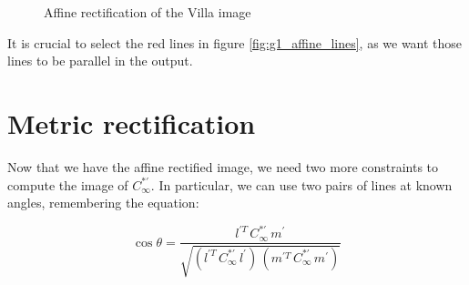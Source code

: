 \documentclass{Configuration_Files/PoliMi3i_thesis}
\begin{document}
\begin{figure}[H]
    \centering
    \quad
    \caption{Affine rectification of the Villa image}
    \label{fig:g1_affine}
\end{figure}

It is crucial to select the red lines in figure \ref{fig:g1_affine_lines}, as we want those lines to be parallel in the output.

\section{Metric rectification}
Now that we have the affine rectified image, we need two more constraints to compute the image of $C^{*'}_\infty$. In particular, we can use two pairs of lines at known angles, remembering the equation:

\[
\cos\theta = \frac{l^{'T}\,C^{*'}_\infty\,m^{'}}{\sqrt{(l^{'T}\,C^{*'}_\infty\,l^{'})\,(m^{'T}\,C^{*'}_\infty\,m^{'})}}
\]
\end{document}
